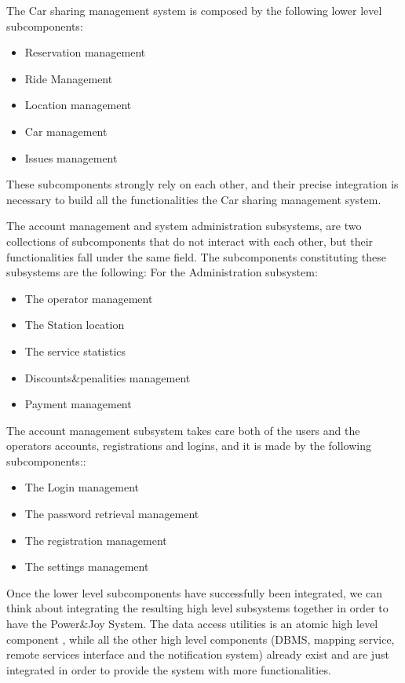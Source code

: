 \documentclass{article}
\begin{document}
\begin{flushleft}
   The Car sharing management system is composed by the following lower level subcomponents:
      \begin{itemize}
   \item Reservation management
   \item Ride Management 
   \item Location management 
   \item Car management 
   \item Issues management 
   \end{itemize}
   
   These subcomponents strongly rely on each other, and their precise integration is necessary to build all the functionalities the Car sharing management system. 
   
   The account management and system administration subsystems, are two collections of subcomponents that do not interact with each other, but their functionalities fall under the same field. The subcomponents constituting these subsystems are the following:
   For the Administration subsystem:
   \begin{itemize}
   \item The operator management 
   \item The Station location 
   \item The service statistics 
   \item Discounts\&penalities management 
   \item Payment management
   \end{itemize}
   
   The account management subsystem takes care both of the users and the operators accounts, registrations and logins, and it is made by the following subcomponents::
   \begin {itemize}
   \item The Login management
   \item The password retrieval management
   \item The registration management 
   \item The settings management 
   \end{itemize}
    
   
   Once the lower level subcomponents have successfully been integrated, we can think about integrating the resulting high level subsystems together in order to have the Power\&Joy System.
   The data access utilities is an atomic high level component , while all the other high level components (DBMS, mapping service, remote services interface and the notification system) already exist and are just integrated in order to provide the system with more functionalities.
   

\end{flushleft}
\end{document}
